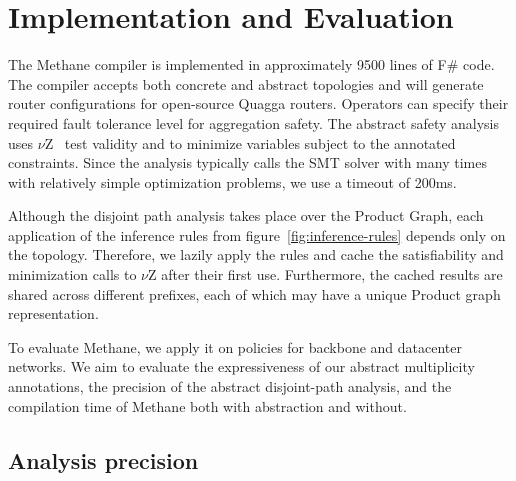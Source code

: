 \documentclass[numbers, 10pt, preprint]{sigplanconf}
\newcommand{\sysname}{{\small \sf Methane}\xspace}
\begin{document}
%
%
%
%


\section{Implementation and Evaluation}
\label{sec:evaluation}

The \sysname compiler is implemented in approximately 9500 lines of F\# code. The compiler accepts both concrete and abstract topologies and will generate router configurations for open-source Quagga routers. Operators can specify their required fault tolerance level for aggregation safety. The abstract safety analysis uses $\nu$Z~\cite{z3opt} test validity and to minimize variables subject to the annotated constraints. Since the analysis typically calls the SMT solver with many times with relatively simple optimization problems, we use a timeout of 200ms.

Although the disjoint path analysis takes place over the Product Graph, each application of the inference rules from figure~\ref{fig:inference-rules} depends only on the topology. Therefore, we lazily apply the rules and cache the satisfiability and minimization calls to $\nu$Z after their first use. Furthermore, the cached results are shared across different prefixes, each of which may have a unique Product graph representation.

To evaluate \sysname, we apply it on policies for backbone and datacenter networks. We aim to evaluate the expressiveness of our abstract multiplicity annotations, the precision of the abstract disjoint-path analysis, and the compilation time of \sysname both with abstraction and without.

\subsection{Analysis precision}
\end{document}

